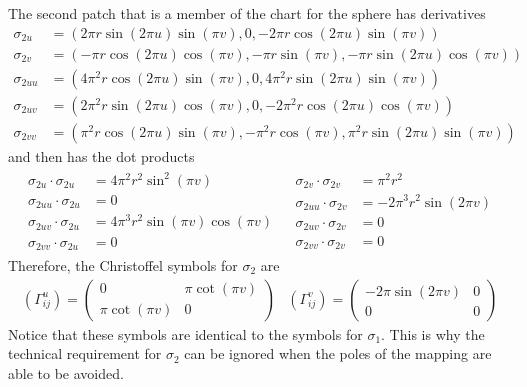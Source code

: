 \documentclass{article}
\begin{document}
		The second patch that is a member of the chart for the sphere has derivatives
		\begin{equation*} \begin{split}
			\sigma_{2u} & = ( 2\pi r \sin(2\pi u)\sin(\pi v) , 0 , -2\pi r \cos(2\pi u)\sin(\pi v) ) \\
			\sigma_{2v} & = ( -\pi r \cos(2\pi u)\cos(\pi v) , -\pi r \sin(\pi v) , -\pi r \sin(2\pi u)\cos(\pi v) ) \\
			\sigma_{2uu} & = ( 4\pi^2r\cos(2\pi u)\sin(\pi v) , 0 , 4\pi^2r\sin(2\pi u)\sin(\pi v) ) \\
			\sigma_{2uv} & = ( 2\pi^2r\sin(2\pi u)\cos(\pi v) , 0 , -2\pi^2r\cos(2\pi u)\cos(\pi v) ) \\
			\sigma_{2vv} & = ( \pi^2r\cos(2\pi u)\sin(\pi v), -\pi^2r\cos(\pi v) , \pi^2r\sin(2\pi u)\sin(\pi v) )
		\end{split} \end{equation*}
		and then has the dot products
		\begin{equation*} \begin{array}{ll}
			\begin{split}
				\sigma_{2u} \cdot \sigma_{2u} & = 4\pi^2r^2\sin^2(\pi v) \\
				\sigma_{2uu} \cdot \sigma_{2u} & = 0 \\
				\sigma_{2uv} \cdot \sigma_{2u} & = 4\pi^3r^2\sin(\pi v)\cos(\pi v) \\
				\sigma_{2vv} \cdot \sigma_{2u} & = 0
			\end{split} & \begin{split}
				\sigma_{2v} \cdot \sigma_{2v} & = \pi^2r^2 \\
				\sigma_{2uu} \cdot \sigma_{2v} & = -2\pi^3r^2\sin(2\pi v) \\
				\sigma_{2uv} \cdot \sigma_{2v} & = 0 \\
				\sigma_{2vv} \cdot \sigma_{2v} & = 0
			\end{split}
		\end{array} \end{equation*}
		Therefore, the Christoffel symbols for $\sigma_2$ are
		\begin{equation}
			\begin{array}{lr}
			\left(\Gamma^{u}_{ij}\right) = \left( \begin{array}{cc}
					0 & \pi\cot(\pi v) \\
					\pi\cot(\pi v) & 0
				\end{array} \right) &
			\left(\Gamma^{v}_{ij}\right) = \left( \begin{array}{cc}
					-2\pi\sin(2\pi v) & 0 \\
					0 & 0
				\end{array} \right)
			\end{array}
		\end{equation}
		Notice that these symbols are identical to the symbols for $\sigma_1$. This is why the technical requirement for $\sigma_2$ can be ignored when the poles of the mapping are able to be avoided.
		
\end{document}

